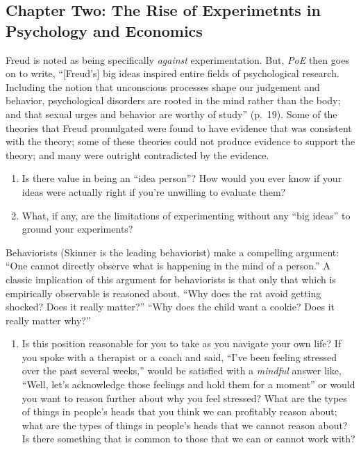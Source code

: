 \documentclass[
]{book}
\providecommand{\tightlist}{%
  \setlength{\itemsep}{0pt}\setlength{\parskip}{0pt}}
\begin{document}
\hypertarget{chapter-two-the-rise-of-experimetnts-in-psychology-and-economics}{%
\subsection{Chapter Two: The Rise of Experimetnts in Psychology and
Economics}\label{chapter-two-the-rise-of-experimetnts-in-psychology-and-economics}}

Freud is noted as being specifically \emph{against} experimentation.
But, \emph{PoE} then goes on to write, ``{[}Freud's{]} big ideas
inspired entire fields of psychological research. Including the notion
that unconscious processes shape our judgement and behavior,
psychological disorders are rooted in the mind rather than the body; and
that sexual urges and behavior are worthy of study'' (p.~19). Some of
the theories that Freud promulgated were found to have evidence that was
consistent with the theory; some of these theories could not produce
evidence to support the theory; and many were outright contradicted by
the evidence.

\begin{enumerate}
\def\labelenumi{\arabic{enumi}.}
\tightlist
\item
  Is there value in being an ``idea person''? How would you ever know if
  your ideas were actually right if you're unwilling to evaluate them?
\item
  What, if any, are the limitations of experimenting without any ``big
  ideas'' to ground your experiments?
\end{enumerate}

Behaviorists (Skinner is the leading behaviorist) make a compelling
argument: ``One cannot directly observe what is happening in the mind of
a person.'' A classic implication of this argument for behaviorists is
that only that which is empirically observable is reasoned about. ``Why
does the rat avoid getting shocked? Does it really matter?'' ``Why does
the child want a cookie? Does it really matter why?''

\begin{enumerate}
\def\labelenumi{\arabic{enumi}.}
\tightlist
\item
  Is this position reasonable for you to take as you navigate your own
  life? If you spoke with a therapist or a coach and said, ``I've been
  feeling stressed over the past several weeks,'' would be satisfied
  with a \emph{mindful} answer like, ``Well, let's acknowledge those
  feelings and hold them for a moment'' or would you want to reason
  further about why you feel stressed? What are the types of things in
  people's heads that you think we can profitably reason about; what are
  the types of things in people's heads that we cannot reason about? Is
  there something that is common to those that we can or cannot work
  with?
\end{enumerate}
\end{document}
